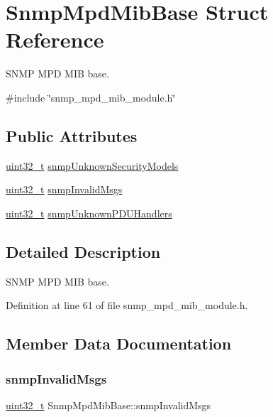 \hypertarget{structSnmpMpdMibBase}{}\section{Snmp\+Mpd\+Mib\+Base Struct Reference}
\label{structSnmpMpdMibBase}


S\+N\+MP M\+PD M\+IB base.  




{\ttfamily \#include \char`\"{}snmp\+\_\+mpd\+\_\+mib\+\_\+module.\+h\char`\"{}}

\subsection*{Public Attributes}
\begin{DoxyCompactItemize}
\item 
\hyperlink{stdint_8h_a435d1572bf3f880d55459d9805097f62}{uint32\+\_\+t} \hyperlink{structSnmpMpdMibBase_a2fdfcfffc897ea81d27f7fa7aae95566}{snmp\+Unknown\+Security\+Models}
\item 
\hyperlink{stdint_8h_a435d1572bf3f880d55459d9805097f62}{uint32\+\_\+t} \hyperlink{structSnmpMpdMibBase_a0e64fd0e3f10ae4940af6a7e2b0907d6}{snmp\+Invalid\+Msgs}
\item 
\hyperlink{stdint_8h_a435d1572bf3f880d55459d9805097f62}{uint32\+\_\+t} \hyperlink{structSnmpMpdMibBase_a57cb4820c82856e73603a9eeb842c506}{snmp\+Unknown\+P\+D\+U\+Handlers}
\end{DoxyCompactItemize}


\subsection{Detailed Description}
S\+N\+MP M\+PD M\+IB base. 

Definition at line 61 of file snmp\+\_\+mpd\+\_\+mib\+\_\+module.\+h.



\subsection{Member Data Documentation}
\mbox{\label{structSnmpMpdMibBase_a0e64fd0e3f10ae4940af6a7e2b0907d6}} 
\subsubsection{\texorpdfstring{snmp\+Invalid\+Msgs}{snmpInvalidMsgs}}
{\footnotesize\ttfamily \hyperlink{stdint_8h_a435d1572bf3f880d55459d9805097f62}{uint32\+\_\+t} Snmp\+Mpd\+Mib\+Base\+::snmp\+Invalid\+Msgs}



